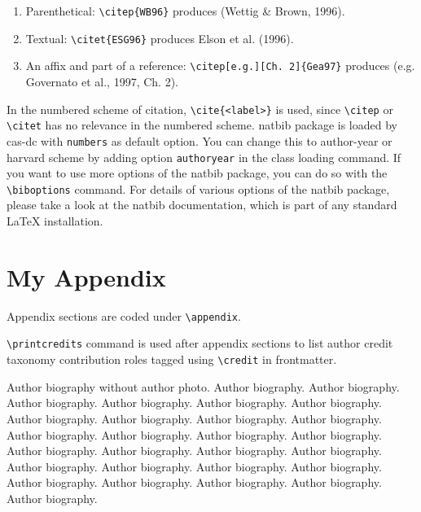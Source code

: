 \documentclass[a4paper,fleqn]{cas-dc}
\begin{document}
\begin{enumerate}[\textbullet]
\item Parenthetical: \verb+\citep{WB96}+ produces (Wettig \& Brown, 1996).
\item Textual: \verb+\citet{ESG96}+ produces Elson et al. (1996).
\item An affix and part of a reference:\break
\verb+\citep[e.g.][Ch. 2]{Gea97}+ produces (e.g. Governato et
al., 1997, Ch. 2).
\end{enumerate}

In the numbered scheme of citation, \verb+\cite{<label>}+ is used,
since \verb+\citep+ or \verb+\citet+ has no relevance in the numbered
scheme.  {natbib} package is loaded by {cas-dc} with
\verb+numbers+ as default option.  You can change this to author-year
or harvard scheme by adding option \verb+authoryear+ in the class
loading command.  If you want to use more options of the {natbib}
package, you can do so with the \verb+\biboptions+ command.  For
details of various options of the {natbib} package, please take a
look at the {natbib} documentation, which is part of any standard
\LaTeX{} installation.

\appendix
\section{My Appendix}
Appendix sections are coded under \verb+\appendix+.

\verb+\printcredits+ command is used after appendix sections to list 
author credit taxonomy contribution roles tagged using \verb+\credit+ 
in frontmatter.

\printcredits


%





\bio{}
Author biography without author photo.
Author biography. Author biography. Author biography.
Author biography. Author biography. Author biography.
Author biography. Author biography. Author biography.
Author biography. Author biography. Author biography.
Author biography. Author biography. Author biography.
Author biography. Author biography. Author biography.
Author biography. Author biography. Author biography.
Author biography. Author biography. Author biography.
Author biography. Author biography. Author biography.
\endbio
\end{document}

